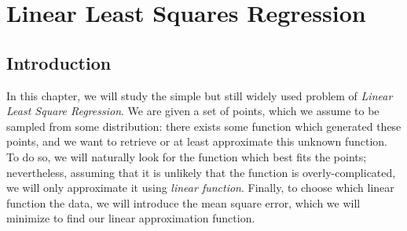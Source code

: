 \documentclass{../cs-classes/cs-classes}
\begin{document}
%
%    
%
%    
%

\section{Linear Least Squares Regression}
\subsection{Introduction}
In this chapter, we will study the simple but still widely used problem of \emph{Linear Least Square Regression}. We are given a set of points, which we assume to be sampled from some distribution: there exists some function which generated these points, and we want to retrieve or at least approximate this unknown function. To do so, we will naturally look for the function which best fits the points; nevertheless, assuming that it is unlikely that the function is overly-complicated, we will only approximate it using \emph{linear function}. Finally, to choose which linear function  the data, we will introduce the mean square error, which we will minimize to find our linear approximation function.
\end{document}

